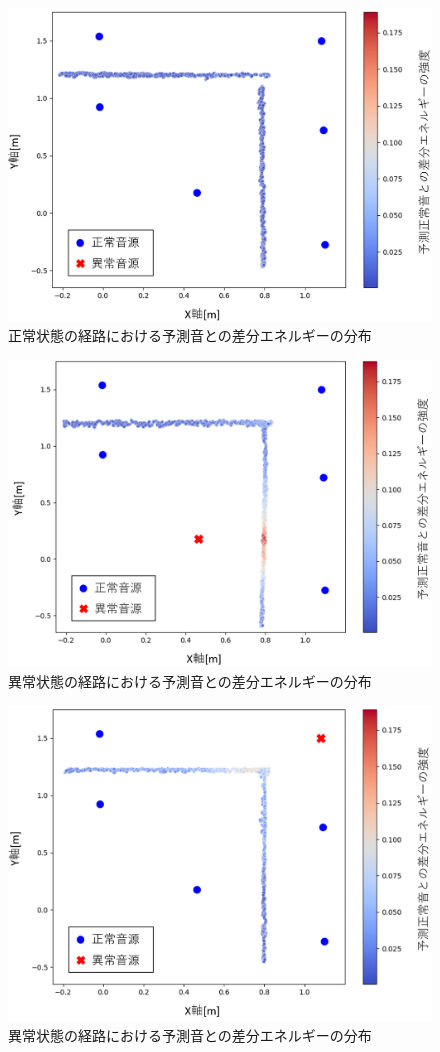 \documentclass[../main]{subfiles}
\begin{document}
\begin{figure}[t]
  \centering
  \includegraphics[keepaspectratio, width=0.7\linewidth]{chap4/lab_normal.png}
  \caption{正常状態の経路における予測音との差分エネルギーの分布}
  \label{fig:lab_normal}
\end{figure}

\begin{figure}[t]
  \centering
  \includegraphics[keepaspectratio, width=0.7\linewidth]{chap4/lab_abnormal2.png}
  \caption{異常状態の経路における予測音との差分エネルギーの分布}
  \label{fig:lab_abnormal2}
\end{figure}

\begin{figure}[t]
  \centering
  \includegraphics[keepaspectratio, width=0.7\linewidth]{chap4/lab_abnormal7.png}
  \caption{異常状態の経路における予測音との差分エネルギーの分布}
  \label{fig:lab_abnormal7}
\end{figure}
\end{document}
